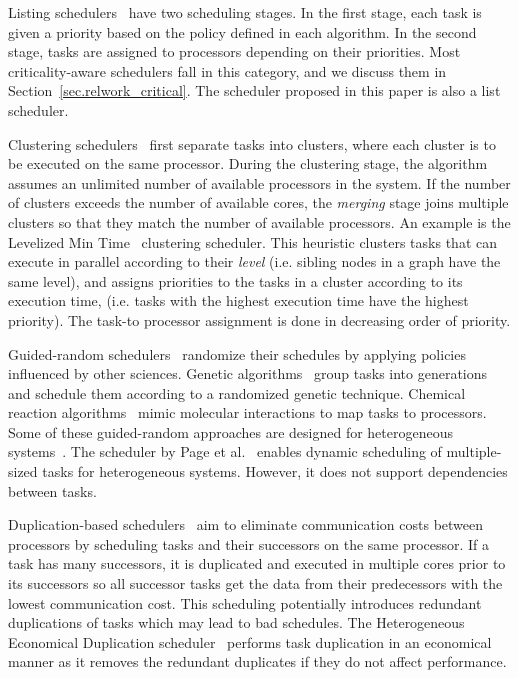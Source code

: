 Listing schedulers~\cite{List, DCPS, LDCP, HEFT, CrPathDup} have two scheduling stages. In the first stage, each task is given a priority based on the policy defined in each algorithm. In the second stage, tasks are assigned to processors depending on their priorities. Most criticality-aware schedulers fall in this category, and we discuss them in Section~\ref{sec.relwork_critical}. The scheduler proposed in this paper is also a list scheduler.

Clustering schedulers~\cite{Hypertool, DSC, DCPS, Hetero95} first separate tasks into clusters, where each cluster is to be executed on the same processor. During the clustering stage, the algorithm assumes an unlimited number of available processors in the system. If the number of clusters exceeds the number of available cores, the \textit{merging} stage joins multiple clusters so that they match the number of available processors. An example is the Levelized Min Time~\cite{Hetero95} clustering scheduler. This heuristic clusters tasks that can execute in parallel according to their \textit{level} (i.e. sibling nodes in a graph have the same level), and assigns priorities to the tasks in a cluster according to its execution time, (i.e. tasks with the highest execution time have the highest priority). The task-to processor assignment is done in decreasing order of priority.

Guided-random schedulers~\cite{Gen07, Chemical, Dyn05} randomize their schedules by applying policies influenced by other sciences. Genetic algorithms~\cite{Gen07} group tasks into generations and schedule them according to a randomized genetic technique. Chemical reaction algorithms~\cite{Chemical} mimic molecular interactions to map tasks to processors. Some of these guided-random approaches are designed for heterogeneous systems~\cite{Gen07, Chemical}. The scheduler by Page et al.~\cite{Dyn05} enables dynamic scheduling of multiple-sized tasks for heterogeneous systems. However, it does not support dependencies between tasks.

Duplication-based schedulers~\cite{Dup03, Dup11, Dup09} aim to eliminate communication costs between processors by scheduling tasks and their successors on the same processor. If a task has many successors, it is duplicated and executed in multiple cores prior to its successors so all successor tasks get the data from their predecessors with the lowest communication cost. This scheduling potentially introduces redundant duplications of tasks which may lead to bad schedules. The Heterogeneous Economical Duplication scheduler~\cite{Dup09} performs task duplication in an economical manner as it removes the redundant duplicates if they do not affect performance. 

